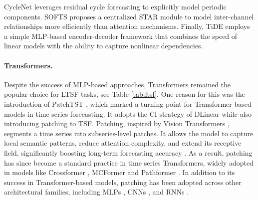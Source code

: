 \documentclass[a4paper,oneside,bibliography=totoc]{scrbook}
\begin{document}
CycleNet \cite{lin_cyclenet_2024} leverages residual cycle forecasting to explicitly model periodic components. %
SOFTS \cite{han_softs_2024} proposes a centralized STAR module to model inter-channel relationships more efficiently than attention mechanisms. 
Finally, TiDE \cite{das_long-term_2023} employs a simple MLP-based encoder-decoder framework that combines the speed of linear models with the ability to capture nonlinear dependencies. %


\paragraph{Transformers.}
Despite the success of MLP-based approaches, Transformers remained the popular choice for LTSF tasks, see Table \ref{tab:ltsf}. 
One reason for this was the introduction of PatchTST \cite{nie_time_2022}, which marked a turning point for Transformer-based models in time series forecasting. It adopts the CI strategy of DLinear \cite{zeng_are_2023} while also introducing patching to TSF.
Patching, inspired by Vision Transformers \cite{dosovitskiy_image_2021}, segments a time series into subseries-level patches. 
It allows the model to capture local semantic patterns, reduce attention complexity, and extend its receptive field, significantly boosting long-term forecasting accuracy \cite{nie_time_2022}. 
As a result, patching has since become a standard practice in time series Transformers, widely adopted in models like Crossformer \cite{zhang_crossformer_2022}, MCFormer \cite{han_mcformer_2024} and Pathformer \cite{chen_pathformer_2023}. 
In addition to its success in Transformer-based models, patching has been adopted across other architectural families, including MLPs \cite{chen_tsmixer_2023}, CNNs \cite{gong_patchmixer_2024}, and RNNs \cite{lin_segrnn_2023}.
\end{document}
